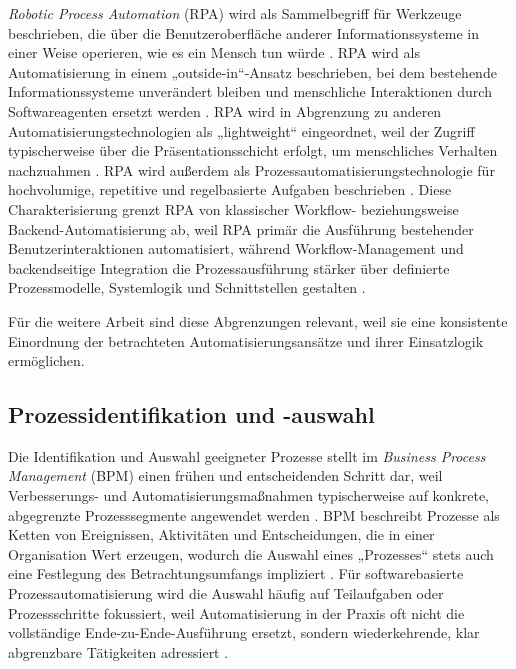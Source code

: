 \emph{Robotic Process Automation} (RPA) wird als Sammelbegriff für Werkzeuge beschrieben, die über die Benutzeroberfläche anderer Informationssysteme in einer Weise operieren, wie es ein Mensch tun würde \cite{AalstBichlerHeinzl2018RPA}. RPA wird als Automatisierung in einem „outside-in“-Ansatz beschrieben, bei dem bestehende Informationssysteme unverändert bleiben und menschliche Interaktionen durch Softwareagenten ersetzt werden \cite{AalstBichlerHeinzl2018RPA}. RPA wird in Abgrenzung zu anderen Automatisierungstechnologien als „lightweight“ eingeordnet, weil der Zugriff typischerweise über die Präsentationsschicht erfolgt, um menschliches Verhalten nachzuahmen \cite{HermJanieschRausch2021}. RPA wird außerdem als Prozessautomatisierungstechnologie für hochvolumige, repetitive und regelbasierte Aufgaben beschrieben \cite{HindelCabreraStierle2020}. Diese Charakterisierung grenzt RPA von klassischer Workflow- beziehungsweise Backend-Automatisierung ab, weil RPA primär die Ausführung bestehender Benutzerinteraktionen automatisiert, während Workflow-Management und backendseitige Integration die Prozessausführung stärker über definierte Prozessmodelle, Systemlogik und Schnittstellen gestalten \cite{AalstBichlerHeinzl2018RPA,OMGWfMF12}. 

Für die weitere Arbeit sind diese Abgrenzungen relevant, weil sie eine konsistente Einordnung der betrachteten Automatisierungsansätze und ihrer Einsatzlogik ermöglichen.


\subsection{Prozessidentifikation und -auswahl}
Die Identifikation und Auswahl geeigneter Prozesse stellt im \emph{Business Process Management} (BPM) einen frühen und entscheidenden Schritt dar, weil Verbesserungs- und Automatisierungsmaßnahmen typischerweise auf konkrete, abgegrenzte Prozesssegmente angewendet werden \cite{DumasEtAl2013}. 
BPM beschreibt Prozesse als Ketten von Ereignissen, Aktivitäten und Entscheidungen, die in einer Organisation Wert erzeugen, wodurch die Auswahl eines „Prozesses“ stets auch eine Festlegung des Betrachtungsumfangs impliziert \cite{DumasEtAl2013}. 
Für softwarebasierte Prozessautomatisierung wird die Auswahl häufig auf Teilaufgaben oder Prozessschritte fokussiert, weil Automatisierung in der Praxis oft nicht die vollständige Ende-zu-Ende-Ausführung ersetzt, sondern wiederkehrende, klar abgrenzbare Tätigkeiten adressiert \cite{AalstBichlerHeinzl2018RPA}. 

